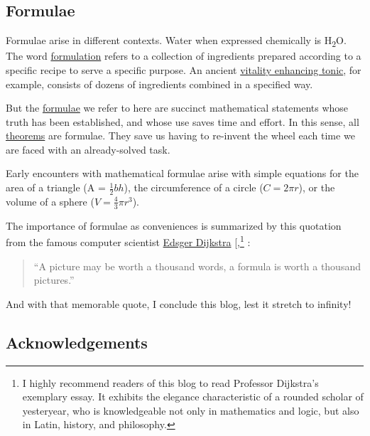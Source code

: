 \documentclass[
  a4paper,
]{article}
\begin{document}
\subsection{Formulae}\label{formulae}

Formulae arise in different contexts. Water when expressed chemically is
H\textsubscript{\(2\)}O. The word
\href{https://www.vocabulary.com/dictionary/formulation}{formulation}
refers to a collection of ingredients prepared according to a specific
recipe to serve a specific purpose. An ancient
\href{https://pmc.ncbi.nlm.nih.gov/articles/PMC6571565/\#:~:text=Chyawanprash\%20is\%20formulated\%20by\%20processing,richest\%20source\%20of\%20vitamin\%20C}{vitality
enhancing tonic}, for example, consists of dozens of ingredients
combined in a specified way.

But the \href{https://en.wikipedia.org/wiki/Formula}{formulae} we refer
to here are succinct mathematical statements whose truth has been
established, and whose use saves time and effort. In this sense, all
\href{https://en.wikipedia.org/wiki/Formula}{theorems} are formulae.
They save us having to re-invent the wheel each time we are faced with
an already-solved task.

Early encounters with mathematical formulae arise with simple equations
for the area of a triangle (A = \(\frac{1}{2}bh\)), the circumference of
a circle (\(C = 2\pi r\)), or the volume of a sphere
(\(V = \frac{4}{3}\pi r^3\)).

The importance of formulae as conveniences is summarized by this
quotation from the famous computer scientist
\href{https://en.wikipedia.org/wiki/Edsger_W._Dijkstra}{Edsger Dijkstra}
{[},\citeproc{ref-dijkstra-html}{6}{]}\footnote{I
  highly recommend readers of this blog to read Professor Dijkstra's
  exemplary essay. It exhibits the elegance characteristic of a rounded
  scholar of yesteryear, who is knowledgeable not only in mathematics
  and logic, but also in Latin, history, and philosophy.} :

\begin{quote}
``A picture may be worth a thousand words, a formula is worth a thousand
pictures.''
\end{quote}

And with that memorable quote, I conclude this blog, lest it stretch to
infinity!

\subsection{Acknowledgements}\label{acknowledgements}
\end{document}

